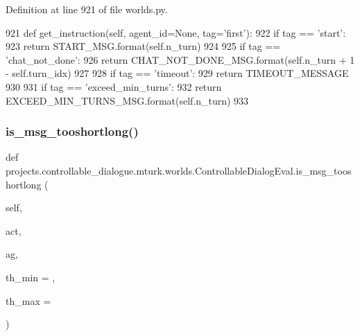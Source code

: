Definition at line 921 of file worlds.\+py.


\begin{DoxyCode}
921     \textcolor{keyword}{def }get\_instruction(self, agent\_id=None, tag='first'):
922         \textcolor{keywordflow}{if} tag == \textcolor{stringliteral}{'start'}:
923             \textcolor{keywordflow}{return} START\_MSG.format(self.n\_turn)
924 
925         \textcolor{keywordflow}{if} tag == \textcolor{stringliteral}{'chat\_not\_done'}:
926             \textcolor{keywordflow}{return} CHAT\_NOT\_DONE\_MSG.format(self.n\_turn + 1 - self.turn\_idx)
927 
928         \textcolor{keywordflow}{if} tag == \textcolor{stringliteral}{'timeout'}:
929             \textcolor{keywordflow}{return} TIMEOUT\_MESSAGE
930 
931         \textcolor{keywordflow}{if} tag == \textcolor{stringliteral}{'exceed\_min\_turns'}:
932             \textcolor{keywordflow}{return} EXCEED\_MIN\_TURNS\_MSG.format(self.n\_turn)
933 
\end{DoxyCode}
\mbox{\label{classprojects_1_1controllable__dialogue_1_1mturk_1_1worlds_1_1ControllableDialogEval_acdbda424344d9c0bf3051e48f931a120}} 
\subsubsection{\texorpdfstring{is\+\_\+msg\+\_\+tooshortlong()}{is\_msg\_tooshortlong()}}
{\footnotesize\ttfamily def projects.\+controllable\+\_\+dialogue.\+mturk.\+worlds.\+Controllable\+Dialog\+Eval.\+is\+\_\+msg\+\_\+tooshortlong (\begin{DoxyParamCaption}\item[{}]{self,  }\item[{}]{act,  }\item[{}]{ag,  }\item[{}]{th\+\_\+min = {},  }\item[{}]{th\+\_\+max = {} }\end{DoxyParamCaption})}



